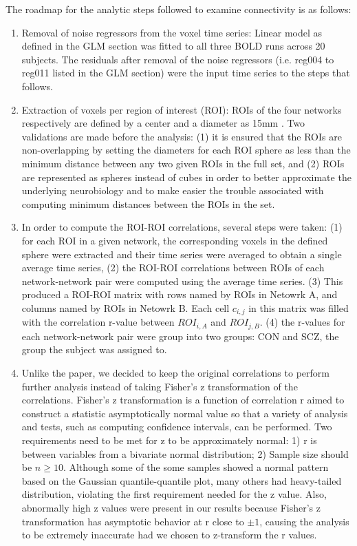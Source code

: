 \documentclass[11pt]{article}
\begin{document}
The roadmap for the analytic steps followed to examine connectivity is as
follows:

\begin{enumerate}
  \item Removal of noise regressors from the voxel time series: Linear model as
    defined in the GLM section was fitted to all three BOLD runs across 20 subjects.
    The residuals  after removal of the noise regressors (i.e. reg004 to reg011 
    listed in the GLM section) were the input time series to the steps that follows.
  \item Extraction of voxels per region of interest (ROI): ROIs of the four
    networks respectively are defined by a center and a diameter as 15mm \cite{repovs2012}. Two 
    validations are made before the analysis: (1) it is ensured that the ROIs are 
    non-overlapping by setting the diameters for each ROI sphere as less than 
    the minimum distance between any two given ROIs in the full set, and 
    (2) ROIs are represented as spheres instead of cubes in order to better 
    approximate the underlying neurobiology and to make easier the trouble 
    associated with computing minimum distances between the ROIs in the set.
  \item In order to compute the ROI-ROI correlations, several steps were
    taken: (1) for each ROI in a given network, the corresponding voxels in the defined
    sphere were extracted and their time series were averaged to obtain a single average 
    time series, (2) the ROI-ROI correlations between ROIs of each network-network pair 
    were computed using the average time series. (3) This produced a ROI-ROI matrix
    with rows named by ROIs in Netowrk A, and columns named by ROIs in Netowrk B. 
    Each cell $c_{i,j}$ in this matrix was filled with the correlation r-value between 
    $ROI_{i, A}$ and $ROI_{j, B}$. (4) the r-values for each network-network pair were
    group into two groups: CON and SCZ, the group the subject was assigned to.
  \item Unlike the paper, we decided to keep the original correlations to perform 
    further analysis instead of taking Fisher's z transformation of the correlations. 
    Fisher's z transformation is a function of correlation r aimed to construct a 
    statistic asymptotically normal value so that a variety of analysis and tests, such 
    as computing confidence intervals, can be performed. Two requirements need to be 
    met for z to be approximately normal: 1) r is between variables from a bivariate 
    normal distribution; 2) Sample size should be $n \geq 10$. Although some of the some 
    samples showed a normal pattern based on the Gaussian quantile-quantile plot, many others 
    had heavy-tailed distribution, violating the first requirement needed for the z value. 
    Also, abnormally high z values were present in our results because Fisher's z
    transformation has asymptotic behavior at r close to $ \pm 1$, causing the analysis to be
    extremely inaccurate had we chosen to z-transform the r values.
\end{enumerate}
\end{document}
